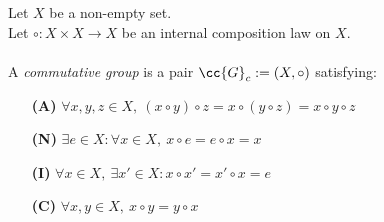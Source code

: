 \begin{definition-pre}
    \label{def:commutative_group}
    Let \(X\) be a non-empty set.\\
    Let \(\circ: X\times X \to X\) be an internal composition law on \(X\). \\\\
    A \textit{commutative group} is a pair \(\cc{G}_c:= (X, \circ)\) satisfying:
    \begin{enumerate}
        \item [\textbf{(A)}] \(\forall x,y,z\in X,\ (x\circ y)\circ z= x\circ (y\circ z) = x\circ y \circ z\)
        \item [\textbf{(N)}] \(\exists e \in X : \forall x \in X,\ x\circ e = e \circ x = x\)
        \item [\textbf{(I)}] \(\forall x \in X,\ \exists x'\in X: x\circ x' = x'\circ x = e\)
        \item [\textbf{(C)}] \(\forall x,y\in X,\ x\circ y = y\circ x\)
    \end{enumerate}
\end{definition-pre}

